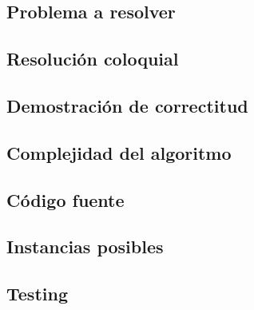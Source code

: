 \subsection{Problema a resolver}

\subsection{Resolución coloquial}

\subsection{Demostración de correctitud}

\subsection{Complejidad del algoritmo}

\subsection{Código fuente}

\subsection{Instancias posibles}

\subsection{Testing}
